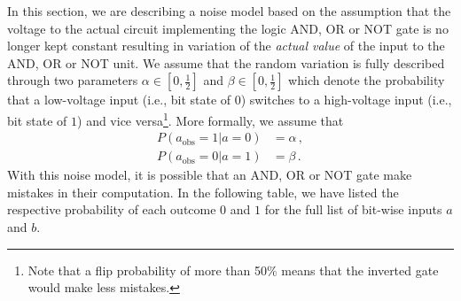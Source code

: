 \label{sec:noisy_adders}
In this section, we are describing a noise model based on the assumption that the voltage to the actual circuit implementing the logic AND, OR or NOT gate is no longer kept constant resulting in variation of the {\em actual value} of the input to the AND, OR or NOT unit. We assume that the random variation is fully described through two parameters $\alpha \in \left[0,\frac{1}{2}\right]$ and $\beta \in \left[0,\frac{1}{2}\right]$ which denote the probability that a low-voltage input (i.e., bit state of $0$) switches to a high-voltage input (i.e., bit state of $1$) and vice versa\footnote{Note that a flip probability of more than 50\% means that the inverted gate would make less mistakes.}. More formally, we assume that
\begin{align}
    P(a_\text{obs} = 1 | a = 0) & = \alpha\,, \label{eq:bit_flip_to_1} \\
    P(a_\text{obs} = 0 | a = 1) & = \beta\,. \label{eq:bit_flip_to_0}
\end{align}
With this noise model, it is possible that an AND, OR or NOT gate make mistakes in their computation. In the following table, we have listed the respective probability of each outcome $0$ and $1$ for the full list of bit-wise inputs $a$ and $b$.

